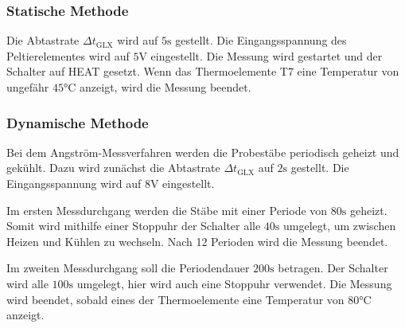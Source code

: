 \subsubsection{Statische Methode}
\label{subsubsec:statisch}
Die Abtastrate $\Delta t_\text{GLX}$ wird auf $5\si{\second}$ gestellt.
Die Eingangsspannung des Peltierelementes wird auf $5\si{\volt}$ eingestellt.
Die Messung wird gestartet und der Schalter auf HEAT gesetzt.
Wenn das Thermoelemente T7 eine Temperatur von ungefähr $45\si{\celsius}$ anzeigt,
wird die Messung beendet.
\subsubsection{Dynamische Methode}
\label{subsubsec:dynamisch}
Bei dem Angström-Messverfahren werden die Probestäbe periodisch geheizt und gekühlt.
Dazu wird zunächst die Abtastrate $\Delta t_\text{GLX}$ auf $2\si{\second}$ gestellt.
Die Eingangsspannung wird auf $8\si{\volt}$ eingestellt.

Im ersten Messdurchgang werden die Stäbe mit einer Periode von $80\si{\second}$ geheizt.
Somit wird mithilfe einer Stoppuhr der Schalter alle $40\si{\second}$ umgelegt, um zwischen Heizen und Kühlen zu wechseln.
Nach 12 Perioden wird die Messung beendet.

Im zweiten Messdurchgang soll die Periodendauer $200\si{\second}$ betragen.
Der Schalter wird alle $100\si{\second}$ umgelegt, hier wird auch eine Stoppuhr verwendet.
Die Messung wird beendet, sobald eines der Thermoelemente eine Temperatur von $80\si{\celsius}$ anzeigt.